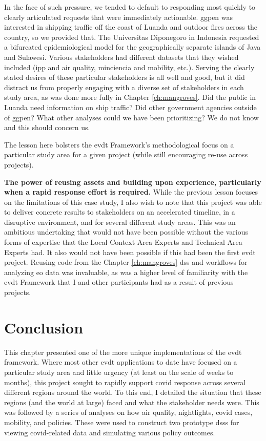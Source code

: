 In the face of such pressure, we tended to default to responding most quickly to clearly articulated requests that were immediately actionable. \ac{ggpen} was interested in shipping traffic off the coast of Luanda and outdoor fires across the country, so we provided that. The Universitas Diponegoro in Indonesia requested a bifurcated epidemiological model for the geographically separate islands of Java and Sulawesi. Various stakeholders had different datasets that they wished included (\ac{ipp} and air quality, \ac{minciencia} and mobility, etc.). Serving the clearly stated desires of these particular stakeholders is all well and good, but it did distract us from properly engaging with a diverse set of stakeholders in each study area, as was done more fully in Chapter \ref{ch:mangroves}. Did the public in Luanda need information on ship traffic? Did other government agencies outside of \ac{ggpen}? What other analyses could we have been prioritizing? We do not know and this should concern us.

The lesson here bolsters the \ac{evdt} Framework's methodological focus on a particular study area for a given project (while still encouraging re-use across projects). 

\textbf{The power of reusing assets and building upon experience, particularly when a rapid response effort is required.} While the previous lesson focuses on the limitations of this case study, I also wish to note that this project was able to deliver concrete results to stakeholders on an accelerated timeline, in a disruptive environment, and for several different study areas. This was an ambitious undertaking that would not have been possible without the various forms of expertise that the Local Context Area Experts and Technical Area Experts had. It also would not have been possible if this had been the first \ac{evdt} project. Reusing code from the Chapter \ref{ch:mangroves} \ac{dss} and workflows for analyzing \ac{eo} data was invaluable, as was a higher level of familiarity with the \ac{evdt} Framework that I and other participants had as a result of previous projects.


\section{Conclusion} \label{sec:vida-concl}

This chapter presented one of the more unique implementations of the \ac{evdt} framework. Where most other \ac{evdt} applications to date have focused on a particular study area and little urgency (at least on the scale of weeks to months), this project sought to rapidly support \ac{covid} response across several different regions around the world. To this end, I detailed the situation that these regions (and the world at large) faced and what the stakeholder needs were. This was followed by a series of analyses on how air quality, nightlights, \ac{covid} cases, mobility, and policies. These were used to construct two prototype \acp{dss} for viewing \ac{covid}-related data and simulating various policy outcomes.

